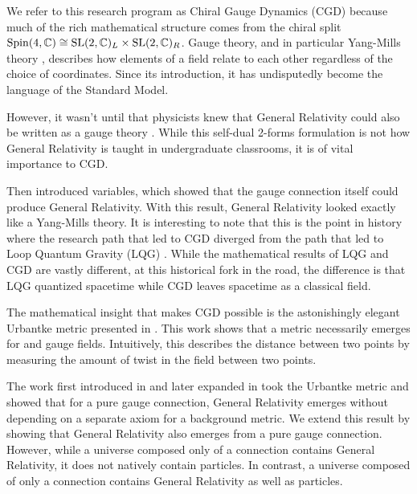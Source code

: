 We refer to this research program as Chiral Gauge Dynamics (CGD) because much of the rich mathematical structure comes from the chiral split $\mathrm{Spin}(4, \mathbb{C}) \cong \mathrm{SL}(2, \mathbb{C})_L \times \mathrm{SL}(2, \mathbb{C})_R$. Gauge theory, and in particular Yang-Mills theory \cite{yang1954conservation}, describes how elements of a field relate to each other regardless of the choice of coordinates. Since its introduction, it has undisputedly become the language of the Standard Model.

However, it wasn't until \citet{plebanski1977separation} that physicists knew that General Relativity could also be written as a gauge theory \citep{krasnov2011plebanski}. While this self-dual 2-forms formulation is not how General Relativity is taught in undergraduate classrooms, it is of vital importance to CGD.

Then \citet{ashtekar1986new} introduced \citeauthor{ashtekar1986new} variables, which showed that the gauge connection itself could produce General Relativity. With this result, General Relativity looked exactly like a Yang-Mills theory. It is interesting to note that this is the point in history where the research path that led to CGD diverged from the path that led to Loop Quantum Gravity (LQG) \citep{rovelli2008loop}. While the mathematical results of LQG and CGD are vastly different, at this historical fork in the road, the difference is that LQG quantized spacetime while CGD leaves spacetime as a classical field.

The mathematical insight that makes CGD possible is the astonishingly elegant Urbantke metric presented in \cite{urbantke1984integrability}. This work shows that a metric necessarily emerges for \suTwo and \spinFourC gauge fields. Intuitively, this describes the distance between two points by measuring the amount of twist in the field between two points.

The work first introduced in \citet{capovilla1989general} and later expanded in \citet{capovilla1991pure} took the Urbantke metric and showed that for a \suTwo pure gauge connection, General Relativity emerges without depending on a separate axiom for a background metric. We extend this result by showing that General Relativity also emerges from a \spinFourC pure gauge connection. However, while a universe composed only of a \suTwo connection contains General Relativity, it does not natively contain particles. In contrast, a universe composed of only a \spinFourC connection contains General Relativity as well as particles.


